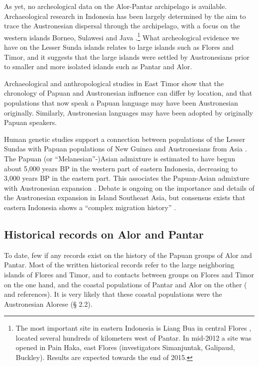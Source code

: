 As yet, no archeological data on the Alor-Pantar archipelago is available. Archaeological research in Indonesia has been largely determined by the aim to trace the Austronesian dispersal through the archipelago, with a focus on the western islands Borneo, Sulawesi and Java \citep{Mahirta2006}.\footnote{The most important site in eastern Indonesia is Liang Bua in central Flores \citep{MorwoodEtAl2004}, located several hundreds of kilometers west of Pantar.  In mid-2012 a site was opened in Pain Haka, east Flores (investigators Simanjuntak, Galipaud, Buckley). Results are expected towards the end of 2015.} What archeological evidence we have on the Lesser Sunda islands relates to large islands such as Flores and Timor, and it suggests that the large islands were settled by Austronesians prior to smaller and more isolated islands such as Pantar and Alor. 

Archaeological and anthropological studies in East Timor \citep{OConnor2003,OConnor2007,McWilliam2007} show that the chronology of Papuan and Austronesian influence can differ by location, and that populations that now speak a Papuan language may have been Austronesian originally. Similarly, Austronesian languages may have been adopted by originally Papuan speakers.

Human genetic studies support a connection between populations of the Lesser Sundas with Papuan populations of New Guinea and Austronesians from Asia \citep{LansingEtAl2011,XuEtAl2012}. The Papuan (or ``Melanesian''-)Asian admixture is estimated to have begun about 5,000 years BP in the western part of eastern Indonesia, decreasing to 3,000 years BP in the eastern part. This associates the Papuan-Asian admixture with Austronesian expansion \citep{XuEtAl2012}. Debate is ongoing on the importance and details of the Austronesian expansion in Island Southeast Asia, but consensus exists that eastern Indonesia shows a ``complex migration history'' \citep[263]{LansingEtAl2011}.

\subsection{Historical records on Alor and Pantar}\label{sec:1:4.2}
To date, few if any records exist on the history of the Papuan groups of Alor and Pantar. Most of the written historical records refer to the large neighboring islands of Flores and Timor, and to contacts between groups on Flores and Timor on the one hand, and the coastal populations of Pantar and Alor on the other (\citealt{Barnes1996,DeRoever2002,Steenbrink2003,Hagerdal2010cannibals,Hagerdal2010galens1,Hagerdal2011,Hagerdal2012} and references). It is very likely that these coastal populations were the Austronesian Alorese ({\S} 2.2). 

